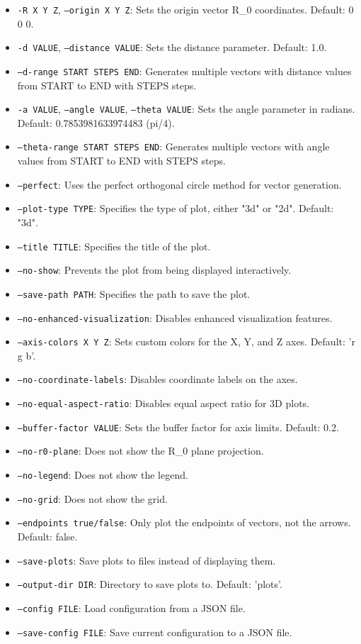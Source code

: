 \begin{itemize}
    \item \texttt{-R X Y Z}, \texttt{--origin X Y Z}: Sets the origin vector R\_0 coordinates. Default: 0 0 0.
    \item \texttt{-d VALUE}, \texttt{--distance VALUE}: Sets the distance parameter. Default: 1.0.
    \item \texttt{--d-range START STEPS END}: Generates multiple vectors with distance values from START to END with STEPS steps.
    \item \texttt{-a VALUE}, \texttt{--angle VALUE}, \texttt{--theta VALUE}: Sets the angle parameter in radians. Default: 0.7853981633974483 (pi/4).
    \item \texttt{--theta-range START STEPS END}: Generates multiple vectors with angle values from START to END with STEPS steps.
    \item \texttt{--perfect}: Uses the perfect orthogonal circle method for vector generation.
    \item \texttt{--plot-type TYPE}: Specifies the type of plot, either "3d" or "2d". Default: "3d".
    \item \texttt{--title TITLE}: Specifies the title of the plot.
    \item \texttt{--no-show}: Prevents the plot from being displayed interactively.
    \item \texttt{--save-path PATH}: Specifies the path to save the plot.
    \item \texttt{--no-enhanced-visualization}: Disables enhanced visualization features.
    \item \texttt{--axis-colors X Y Z}: Sets custom colors for the X, Y, and Z axes. Default: 'r g b'.
    \item \texttt{--no-coordinate-labels}: Disables coordinate labels on the axes.
    \item \texttt{--no-equal-aspect-ratio}: Disables equal aspect ratio for 3D plots.
    \item \texttt{--buffer-factor VALUE}: Sets the buffer factor for axis limits. Default: 0.2.
    \item \texttt{--no-r0-plane}: Does not show the R\_0 plane projection.
    \item \texttt{--no-legend}: Does not show the legend.
    \item \texttt{--no-grid}: Does not show the grid.
    \item \texttt{--endpoints true/false}: Only plot the endpoints of vectors, not the arrows. Default: false.
    \item \texttt{--save-plots}: Save plots to files instead of displaying them.
    \item \texttt{--output-dir DIR}: Directory to save plots to. Default: 'plots'.
    \item \texttt{--config FILE}: Load configuration from a JSON file.
    \item \texttt{--save-config FILE}: Save current configuration to a JSON file.
\end{itemize}

